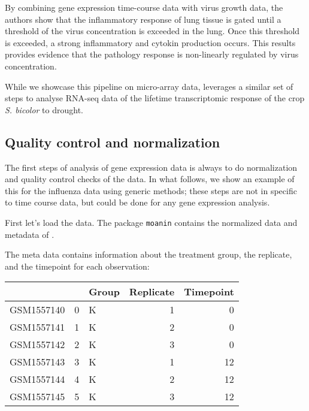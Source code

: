 \documentclass[9pt,a4paper,]{extarticle}
\newenvironment{Shaded}{\begin{snugshade}}{\end{snugshade}}
\newcommand{\CommentTok}[1]{\textcolor[rgb]{0.56,0.35,0.01}{\textit{#1}}}
\newcommand{\KeywordTok}[1]{\textcolor[rgb]{0.13,0.29,0.53}{\textbf{#1}}}
\newcommand{\NormalTok}[1]{#1}
\newcommand{\OperatorTok}[1]{\textcolor[rgb]{0.81,0.36,0.00}{\textbf{#1}}}
\newcommand{\StringTok}[1]{\textcolor[rgb]{0.31,0.60,0.02}{#1}}
\begin{document}
By combining gene expression time-course data with virus growth data, the
authors show that the inflammatory response of lung tissue is gated until a
threshold of the virus concentration is exceeded in the lung. Once this
threshold is exceeded, a strong inflammatory and cytokin production occurs.
This results provides evidence that the pathology response is non-linearly
regulated by virus concentration.

While we showcase this pipeline on micro-array data, \citep{varoquaux:lifecycle}
leverages a similar set of steps to analyse RNA-seq data of the lifetime
transcriptomic response of the crop \emph{S. bicolor} to drought.

\hypertarget{quality-control-and-normalization}{%
\subsection{Quality control and normalization}\label{quality-control-and-normalization}}

The first steps of analysis of gene expression data is always to do
normalization and quality control checks of the data. In what follows, we show
an example of this for the influenza data using generic methods; these steps
are not in specific to time course data, but could be done for any gene expression
analysis.

First let's load the data. The package \texttt{moanin} contains the normalized
data and metadata of \citep{shoemaker:ultrasensitive}.

\begin{Shaded}
\end{Shaded}

The meta data contains information about the treatment group, the replicate,
and the timepoint for each observation:

\begin{tabular}{l|r|l|r|r}
\hline
  &  & Group & Replicate & Timepoint\\
\hline
GSM1557140 & 0 & K & 1 & 0\\
\hline
GSM1557141 & 1 & K & 2 & 0\\
\hline
GSM1557142 & 2 & K & 3 & 0\\
\hline
GSM1557143 & 3 & K & 1 & 12\\
\hline
GSM1557144 & 4 & K & 2 & 12\\
\hline
GSM1557145 & 5 & K & 3 & 12\\
\hline
\end{tabular}
\end{document}
